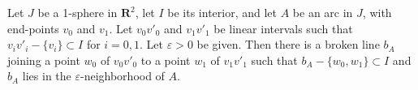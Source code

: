 Let $J$ be a 1-sphere in $\mathbf{R}^2$, let $I$ be its interior, and let $A$ be an arc in $J$, with end-points $v_0$ and $v_1$. Let $v_0v'_0$ and $v_1v'_1$ be linear intervals such that $v_i v'_i - \{v_i\} \subset I$ for $i = 0, 1$. Let $\varepsilon > 0$ be given. Then there is a broken line $b_A$ joining a point $w_0$ of $v_0 v'_0$ to a point $w_1$ of $v_1 v'_1$ such that $b_A - \{w_0, w_1\} \subset I$ and $b_A$ lies in the $\varepsilon$-neighborhood of $A$.
